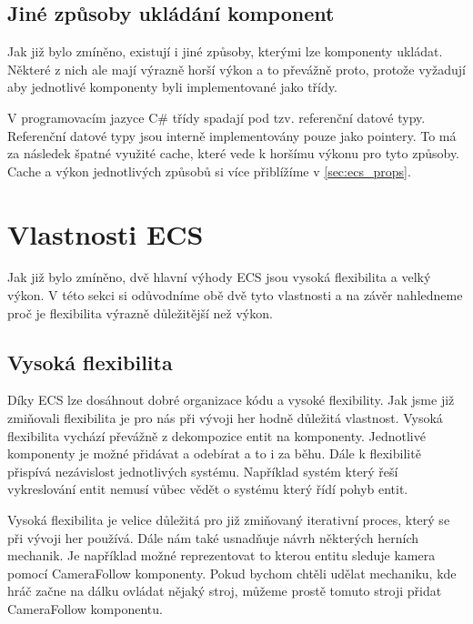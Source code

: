 


\subsection{Jiné způsoby ukládání komponent}
\label{sec:component_as_pointers}
Jak již bylo zmíněno, existují i jiné způsoby, kterými lze komponenty ukládat. Některé z nich ale mají výrazně horší výkon a to převážně proto, protože vyžadují aby jednotlivé komponenty byli implementované jako třídy.

V programovacím jazyce C\# třídy spadají pod tzv. referenční datové typy. Referenční datové typy jsou interně implementovány pouze jako pointery. To má za následek špatné využité cache, které vede k horšímu výkonu pro tyto způsoby. Cache a výkon jednotlivých způsobů si více přiblížíme v \ref{sec:ecs_props}.


\section{Vlastnosti ECS}
Jak již bylo zmíněno, dvě hlavní výhody ECS jsou vysoká flexibilita a velký výkon. V této sekci si odůvodníme obě dvě tyto vlastnosti a na závěr nahledneme proč je flexibilita výrazně důležitější než výkon.

\subsection{Vysoká flexibilita}

Díky ECS lze dosáhnout dobré organizace kódu a vysoké flexibility. Jak jsme již zmiňovali flexibilita je pro nás při vývoji her hodně důležitá vlastnost. Vysoká flexibilita vychází převážně z dekompozice entit na komponenty. Jednotlivé komponenty je možné přidávat a odebírat a to i za běhu. Dále k flexibilitě přispívá nezávislost jednotlivých systému. Například systém který řeší vykreslování entit nemusí vůbec vědět o systému který řídí pohyb entit.

Vysoká flexibilita je velice důležitá pro již zmiňovaný iterativní proces, který se při vývoji her používá. Dále nám také usnadňuje návrh některých herních mechanik. Je například možné reprezentovat to kterou entitu sleduje kamera pomocí CameraFollow komponenty. Pokud bychom chtěli udělat mechaniku, kde hráč začne na dálku ovládat nějaký stroj, můžeme prostě tomuto stroji přidat CameraFollow komponentu.

